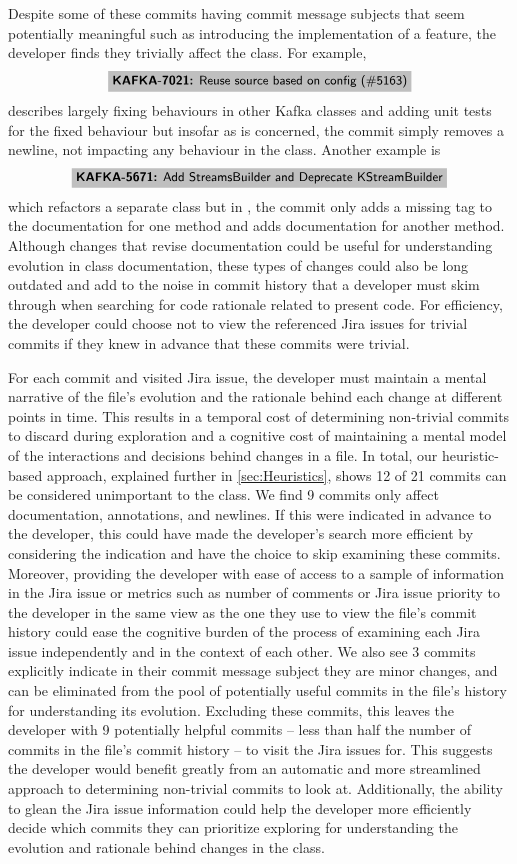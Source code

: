 Despite some of these commits having commit message subjects that seem potentially meaningful such as introducing the implementation of a feature, the developer finds they trivially affect the  class. 
For example, 
$$
\colorbox{lightgray}{\jira{KAFKA-7021:}{Reuse source based on config (\#5163)}} 
$$
describes largely fixing behaviours in other Kafka classes and adding unit tests for the fixed behaviour but insofar as  is concerned, the commit simply removes a newline, not impacting any behaviour in the class. 
Another example is 
$$
\colorbox{lightgray}{\jira{KAFKA-5671:}{Add StreamsBuilder and Deprecate KStreamBuilder}} 
$$
which refactors a separate class but in , the commit only adds a missing  tag to the documentation for one method and adds documentation for another method.
Although changes that revise documentation could be useful for understanding evolution in class documentation, these types of changes could also be long outdated and add to the noise in commit history that a developer must skim through when searching for code rationale related to present code.
For efficiency, the developer could choose not to view the referenced Jira issues for trivial commits if they knew in advance that these commits were trivial.

For each commit and visited Jira issue, the developer must maintain a mental narrative of the file's evolution and the rationale behind each change at different points in time. 
This results in a temporal cost of determining non-trivial commits to discard during exploration and a cognitive cost of maintaining a mental model of the interactions and decisions behind changes in a file. 
In total, our heuristic-based approach, explained further in \autoref{sec:Heuristics}, shows 12 of 21 commits can be considered unimportant to the  class. 
We find 9 commits only affect documentation, annotations, and newlines.
If this were indicated in advance to the developer, this could have made the developer's search more efficient by considering the indication and have the choice to skip examining these commits.
Moreover, providing the developer with ease of access to a sample of information in the Jira issue or metrics such as number of comments or Jira issue priority to the developer in the same view as the one they use to view the file's commit history could ease the cognitive burden of the process of examining each Jira issue independently and in the context of each other.
We also see 3 commits explicitly indicate in their commit message subject they are minor changes, and can be eliminated from the pool of potentially useful commits in the file's history for understanding its evolution.
Excluding these commits, this leaves the developer with 9 potentially helpful commits -- less than half the number of commits in the file's commit history -- to visit the Jira issues for.
This suggests the developer would benefit greatly from an automatic and more streamlined approach to determining non-trivial commits to look at.
Additionally, the ability to glean the Jira issue information could help the developer more efficiently decide which commits they can prioritize exploring for understanding the evolution and rationale behind changes in the  class.

